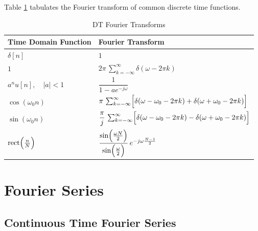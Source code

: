 Table \ref{tab:dtfourier_transforms} tabulates the
Fourier transform of common discrete time functions.

\begin{table}[ht]
    \centering
    \caption{DT Fourier Transforms}
    \label{tab:dtfourier_transforms}
    \begin{tabular}{ll}
        \toprule
        \textbf{Time Domain Function}          & \textbf{Fourier Transform}                                                                                             \\
        \midrule
        $\delta[n]$                            & $1$                                                                                                                    \\[1mm]
        $1$                                    & $2\pi\,\sum_{k=-\infty}^{\infty}\delta(\omega-2\pi k)$                                                                 \\[1mm]
        $a^n u[n],\quad |a|<1$                 & $\dfrac{1}{1-ae^{-j\omega}}$                                                                                           \\[1mm]
        $\cos(\omega_0 n)$                     & $\pi\,\sum_{k=-\infty}^{\infty}\Bigl[\delta(\omega-\omega_0-2\pi k) + \delta(\omega+\omega_0-2\pi k)\Bigr]$            \\[1mm]
        $\sin(\omega_0 n)$                     & $\dfrac{\pi}{j}\,\sum_{k=-\infty}^{\infty}\Bigl[\delta(\omega-\omega_0-2\pi k) - \delta(\omega+\omega_0-2\pi k)\Bigr]$ \\[1mm]
        $\mathrm{rect}\Bigl(\frac{n}{N}\Bigr)$ & $\dfrac{\sin\Bigl(\frac{\omega N}{2}\Bigr)}{\sin\Bigl(\frac{\omega}{2}\Bigr)}\,e^{-j\omega\frac{N-1}{2}}$              \\
        \bottomrule
    \end{tabular}
\end{table}

\section{Fourier Series}

\subsection{Continuous Time Fourier Series}

